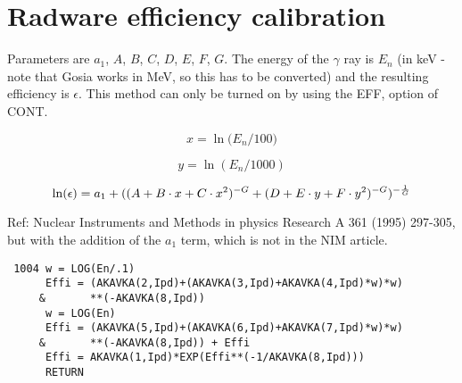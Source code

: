 \section{Radware efficiency calibration}

Parameters are $a_1$, $A$, $B$, $C$, $D$, $E$, $F$, $G$. The
energy of the $\gamma$ ray is $E_n$ (in keV - note that Gosia works in MeV,
so this has to be converted) and the resulting efficiency is $\epsilon$.
This method can only be turned on by using the EFF, option of CONT.

\begin{equation}
x = \ln\big({E_n/100}\big)
\end{equation}

\begin{equation}
y = \ln(E_n/1000)
\end{equation}

\begin{equation}
\ln(\epsilon) = a_1 + ((A + B \cdot x + C \cdot x^2) ^{-G} +
(D + E \cdot y + F \cdot y^2)^{-G})^{-{1 \over G}}
\end{equation}

Ref: Nuclear Instruments and Methods in physics Research A 361 (1995)
297-305, but with the addition of the $a_1$ term, which is not in the NIM
article.

\begin{verbatim}
 1004 w = LOG(En/.1)
      Effi = (AKAVKA(2,Ipd)+(AKAVKA(3,Ipd)+AKAVKA(4,Ipd)*w)*w)
     &       **(-AKAVKA(8,Ipd))
      w = LOG(En)
      Effi = (AKAVKA(5,Ipd)+(AKAVKA(6,Ipd)+AKAVKA(7,Ipd)*w)*w)
     &       **(-AKAVKA(8,Ipd)) + Effi
      Effi = AKAVKA(1,Ipd)*EXP(Effi**(-1/AKAVKA(8,Ipd)))
      RETURN
\end{verbatim}

